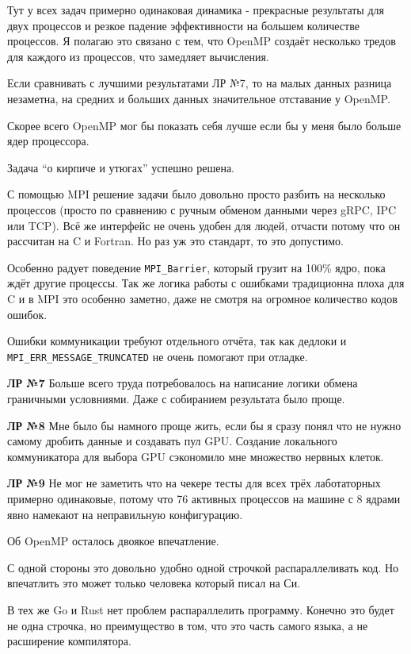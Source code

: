 \documentclass[12pt]{article}
\begin{document}
Тут у всех задач примерно одинаковая динамика - прекрасные результаты для двух процессов и резкое падение
эффективности на большем количестве процессов. Я полагаю это связано с тем, что OpenMP создаёт несколько тредов
для каждого из процессов, что замедляет вычисления.

Если сравнивать с лучшими результатами ЛР №7, то на малых данных разница незаметна,
на средних и больших данных значительное отставание у OpenMP.

Скорее всего OpenMP мог бы показать себя лучше если бы у меня было больше ядер процессора.


Задача ``о кирпиче и утюгах'' успешно решена.

С помощью MPI решение задачи было довольно просто разбить на несколько процессов
(просто по сравнению с ручным обменом данными через gRPC, IPC или TCP).
Всё же интерфейс не очень удобен для людей, отчасти потому что он рассчитан на C и Fortran.
Но раз уж это стандарт, то это допустимо.

Особенно радует поведение \lstinline{MPI_Barrier}, который грузит на 100\% ядро, пока ждёт другие процессы.
Так же логика работы с ошибками традиционна плоха для C и в MPI это особенно заметно,
даже не смотря на огромное количество кодов ошибок.

Ошибки коммуникации требуют отдельного отчёта, так как дедлоки и \\
\lstinline{MPI_ERR_MESSAGE_TRUNCATED} не очень помогают при отладке.

\textbf{ЛР №7}
Больше всего труда потребовалось на написание логики обмена граничными
условниями. Даже с собиранием результата было проще.

\textbf{ЛР №8}
Мне было бы намного проще жить, если бы я сразу понял что не нужно самому дробить данные и создавать пул GPU.
Создание локального коммуникатора для выбора GPU сэкономило мне множество нервных клеток.

\textbf{ЛР №9}
Не мог не заметить что на чекере тесты для всех трёх лаботаторных примерно одинаковые,
потому что 76 активных процессов на машине с 8 ядрами явно намекают на неправильную конфигурацию.

Об OpenMP осталось двоякое впечатление.

С одной стороны это довольно удобно одной строчкой распараллеливать код.
Но впечатлить это может только человека который писал на Си.

В тех же Go и Rust нет проблем распараллелить программу. Конечно это будет не одна строчка, но преимущество в том,
что это часть самого языка, а не расширение компилятора.
\end{document}
